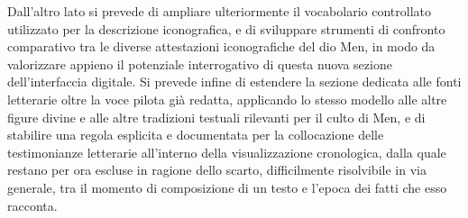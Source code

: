 \documentclass[11pt,a4paper]{article}
\begin{document}
Dall'altro lato si prevede di ampliare ulteriormente il vocabolario
controllato utilizzato per la descrizione iconografica, e di
sviluppare strumenti di confronto comparativo tra le diverse
attestazioni iconografiche del dio Men, in modo da valorizzare appieno
il potenziale interrogativo di questa nuova sezione dell'interfaccia
digitale. Si prevede infine di estendere la sezione dedicata alle fonti
letterarie oltre la voce pilota già redatta, applicando lo stesso
modello alle altre figure divine e alle altre tradizioni testuali
rilevanti per il culto di Men, e di stabilire una regola esplicita e
documentata per la collocazione delle testimonianze letterarie
all'interno della visualizzazione cronologica, dalla quale restano per
ora escluse in ragione dello scarto, difficilmente risolvibile in via
generale, tra il momento di composizione di un testo e l'epoca dei fatti
che esso racconta.
\end{document}
